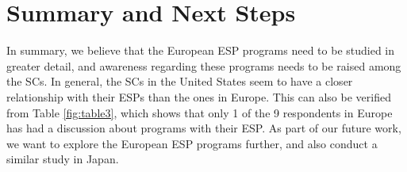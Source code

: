 \section{Summary and Next Steps}
\label{summary}


In summary, we believe that the European ESP programs need to be studied in greater detail, and awareness regarding these programs needs to be raised among the SCs. In general, the SCs in the United States seem to have a closer relationship with their ESPs than the ones in Europe. This can also be verified from Table \ref{fig:table3}, which shows that only 1 of the 9 respondents in Europe has had a discussion about programs with their ESP. As part of our future work, we want to explore the European ESP programs further, and also conduct a similar study in Japan.